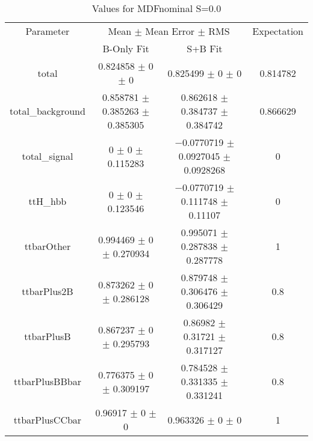 \begin{table}
\centering
\caption{Values for MDFnominal S=0.0}
\begin{tabular}{cccc}
\toprule
Parameter & \multicolumn{2}{c}{Mean $\pm$ Mean Error $\pm$ RMS} & Expectation\\
 & B-Only Fit & S+B Fit & \\
\midrule
total & \num{0.824858} $\pm$ \num{0} $\pm$ \num{0} & \num{0.825499} $\pm$ \num{0} $\pm$ \num{0} & \num{0.814782}\\
total\_background & \num{0.858781} $\pm$ \num{0.385263} $\pm$ \num{0.385305} & \num{0.862618} $\pm$ \num{0.384737} $\pm$ \num{0.384742} & \num{0.866629}\\
total\_signal & \num{0} $\pm$ \num{0} $\pm$ \num{0.115283} & \num{-0.0770719} $\pm$ \num{0.0927045} $\pm$ \num{0.0928268} & \num{0}\\
ttH\_hbb & \num{0} $\pm$ \num{0} $\pm$ \num{0.123546} & \num{-0.0770719} $\pm$ \num{0.111748} $\pm$ \num{0.11107} & \num{0}\\
ttbarOther & \num{0.994469} $\pm$ \num{0} $\pm$ \num{0.270934} & \num{0.995071} $\pm$ \num{0.287838} $\pm$ \num{0.287778} & \num{1}\\
ttbarPlus2B & \num{0.873262} $\pm$ \num{0} $\pm$ \num{0.286128} & \num{0.879748} $\pm$ \num{0.306476} $\pm$ \num{0.306429} & \num{0.8}\\
ttbarPlusB & \num{0.867237} $\pm$ \num{0} $\pm$ \num{0.295793} & \num{0.86982} $\pm$ \num{0.31721} $\pm$ \num{0.317127} & \num{0.8}\\
ttbarPlusBBbar & \num{0.776375} $\pm$ \num{0} $\pm$ \num{0.309197} & \num{0.784528} $\pm$ \num{0.331335} $\pm$ \num{0.331241} & \num{0.8}\\
ttbarPlusCCbar & \num{0.96917} $\pm$ \num{0} $\pm$ \num{0} & \num{0.963326} $\pm$ \num{0} $\pm$ \num{0} & \num{1}\\
\bottomrule
\end{tabular}
\end{table}